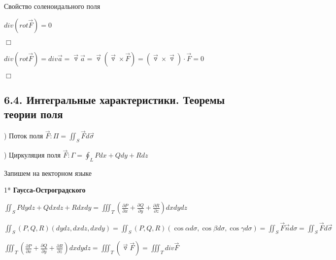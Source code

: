 \documentclass[12pt]{article}
\begin{document}
    \hypertarget{solenoidalfieldproperty}{}

     Свойство соленоидального поля

    $div (rot \overrightarrow{F}) = 0$

    $\Box$

    $div (rot \overrightarrow{F}) = div \overrightarrow{a} = \overrightarrow{\triangledown} \overrightarrow{a} = \overrightarrow{\triangledown} (\overrightarrow{\triangledown} \times \overrightarrow{F}) = (\overrightarrow{\triangledown} \times \overrightarrow{\triangledown}) \cdot \overrightarrow{F} = 0$

    $\Box$

    \hypertarget{integralcharacteristics}{}

    \subsection{6.4. Интегральные характеристики. Теоремы теории поля}

    ) Поток поля $\overrightarrow{F}: \Pi = \iint_S \overrightarrow{F}d\overrightarrow{\sigma}$

    ) Циркуляция поля $\overrightarrow{F}: \Gamma = \oint_L Pdx + Qdy + Rdz$

    \Nota Запишем \Ths на векторном языке

    \hypertarget{theoremGaussOstrogradskyyinvectorform}{}

    1* \textbf{Гаусса-Остроградского}

    $\iint_S Pdydz + Qdxdz + Rdxdy = \iiint_T \left(\frac{\partial P}{\partial x} + \frac{\partial Q}{\partial y} + \frac{\partial R}{\partial z}\right) dxdydz$

    $\iint_S (P, Q, R) (dydz, dxdz, dxdy) = \iint_S (P, Q, R) (\cos\alpha d\sigma, \cos\beta d\sigma, \cos\gamma d\sigma) =
    \iint_S \overrightarrow{F} \overrightarrow{n} d\sigma = \iint_S \overrightarrow{F} d\overrightarrow{\sigma}$

    $\iiint_T \left(\frac{\partial P}{\partial x} + \frac{\partial Q}{\partial y} + \frac{\partial R}{\partial z}\right) dxdydz = \iiint_T (\overrightarrow{\triangledown} \overrightarrow{F}) = \iiint_T div \overrightarrow{F}$


    \mediumvspace

    \hypertarget{theoremStokesinvectorform}{}
\end{document}
